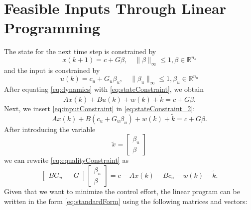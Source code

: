 \documentclass[10pt,a4paper]{article}
\renewcommand{\^}[1]{^{(#1)}}
\begin{document}
\section{Feasible Inputs Through Linear Programming}

The state for the next time step is constrained by
\begin{equation} \label{eq:stateConstraint}
 x(k+1) = c + G \beta, \quad \|\beta\|_\infty \leq 1, \beta \in \mathbb{R}^{n_s}
\end{equation}
and the input is constrained by
\begin{equation} \label{eq:inputConstraint}
 u(k) = c_u + G_u \beta_u, \quad \|\beta_u\|_\infty \leq 1, \beta_u \in \mathbb{R}^{n_u}
\end{equation}
After equating \eqref{eq:dynamics} with \eqref{eq:stateConstraint}, we obtain
\begin{equation} \label{eq:stateConstraint_2}
 A x(k) + B u(k) + w(k) + \tilde{k} = c + G \beta.
\end{equation}
Next, we insert \eqref{eq:inputConstraint} in \eqref{eq:stateConstraint_2}:
\begin{equation} \label{eq:equalityConstraint}
 A x(k) + B(c_u + G_u \beta_u) + w(k) + \tilde{k} = c + G \beta.
\end{equation}
After introducing the variable 
\begin{equation*}
 \tilde{x} = \begin{bmatrix} 
              \beta_u \\
              \beta
             \end{bmatrix}
\end{equation*}
we can rewrite \eqref{eq:equalityConstraint} as
\begin{equation}
 \begin{bmatrix}
  B G_u & -G
 \end{bmatrix}
 \begin{bmatrix}
  \beta_u \\
  \beta
 \end{bmatrix} =
 c - Ax(k) - B c_u - w(k) - \tilde{k}.
\end{equation}
Given that we want to minimize the control effort, the linear program can be written in the form \eqref{eq:standardForm} using the following matrices and vectors:
\end{document}
